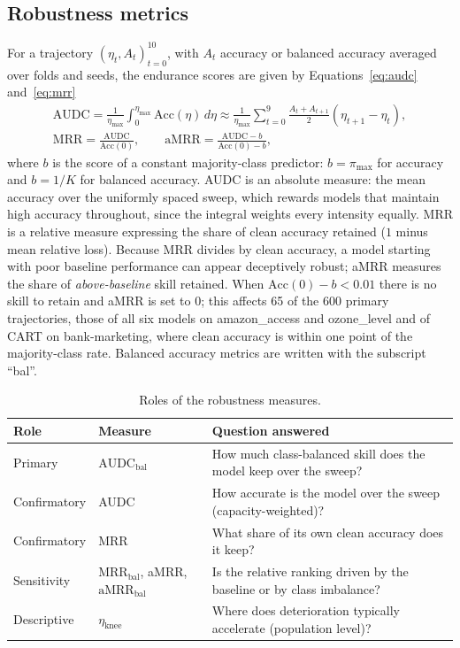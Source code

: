 \documentclass[pdflatex,sn-mathphys]{sn-jnl}
\theoremstyle{thmstyleone}
\theoremstyle{thmstyletwo}
\theoremstyle{thmstylethree}
\newcommand{\Acc}{\mathrm{Acc}}
\newcommand{\AUDC}{\mathrm{AUDC}}
\newcommand{\MRR}{\mathrm{MRR}}
\newcommand{\aMRR}{\mathrm{aMRR}}
\newcommand{\etamax}{\eta_{\max}}
\newcommand{\etaknee}{\eta_{\mathrm{knee}}}
\begin{document}
\subsection{Robustness metrics}\label{sec:problem:metrics}

For a trajectory $(\eta_t,A_t)_{t=0}^{10}$, with $A_t$ accuracy or balanced accuracy averaged over folds and seeds, the endurance scores are given by Equations~\eqref{eq:audc} and~\eqref{eq:mrr}
\begin{gather}
\AUDC=\frac{1}{\etamax}\int_0^{\etamax}\Acc(\eta)\,d\eta\approx\frac{1}{\etamax}\sum_{t=0}^{9}\frac{A_t+A_{t+1}}{2}(\eta_{t+1}-\eta_t),\label{eq:audc}\\
\MRR=\frac{\AUDC}{\Acc(0)},\qquad \aMRR=\frac{\AUDC-b}{\Acc(0)-b},\label{eq:mrr}
\end{gather}
where $b$ is the score of a constant majority-class predictor: $b=\pi_{\max}$ for accuracy and $b=1/K$ for balanced accuracy. AUDC is an absolute measure: the mean accuracy over the uniformly spaced sweep, which rewards models that maintain high accuracy throughout, since the integral weights every intensity equally. MRR is a relative measure expressing the share of clean accuracy retained ($1$ minus mean relative loss). Because MRR divides by clean accuracy, a model starting with poor baseline performance can appear deceptively robust; aMRR measures the share of \emph{above-baseline} skill retained. When $\Acc(0)-b<0.01$ there is no skill to retain and aMRR is set to 0; this affects 65 of the 600 primary trajectories, those of all six models on amazon\_access and ozone\_level and of CART on bank-marketing, where clean accuracy is within one point of the majority-class rate. Balanced accuracy metrics are written with the subscript ``bal''.

\begin{table}[t]
\centering
\footnotesize
\caption{Roles of the robustness measures.}\label{tab:roles}
\begin{tabular}{@{}llp{6.5cm}@{}}
\toprule
Role & Measure & Question answered \\
\midrule
Primary & $\AUDC_{\mathrm{bal}}$ & How much class-balanced skill does the model keep over the sweep? \\
Confirmatory & AUDC & How accurate is the model over the sweep (capacity-weighted)? \\
Confirmatory & MRR & What share of its own clean accuracy does it keep? \\
Sensitivity & $\MRR_{\mathrm{bal}}$, aMRR, $\aMRR_{\mathrm{bal}}$ & Is the relative ranking driven by the baseline or by class imbalance? \\
Descriptive & $\etaknee$ & Where does deterioration typically accelerate (population level)? \\
\bottomrule
\end{tabular}
\end{table}
\end{document}
